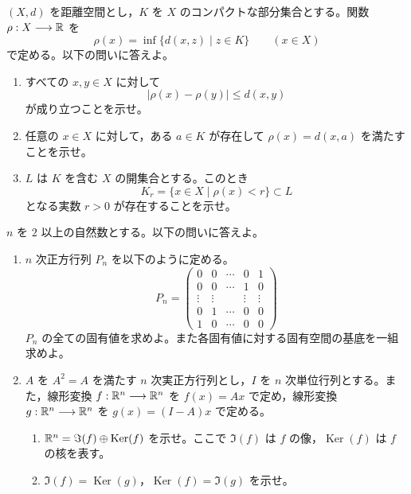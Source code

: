 $(X,d)$ を距離空間とし，$K$ を $X$ のコンパクトな部分集合とする。関数 $\rho:X\longrightarrow\mathbb{R}$ を
\[
\rho(x)=\inf\{d(x,z)\mid z\in K\}\qquad(x\in X)
\]
で定める。以下の問いに答えよ。
\begin{enumerate}
  \item[(問1)] すべての $x,y\in X$ に対して
  \[
  |\rho(x)-\rho(y)|\le d(x,y)
  \]
  が成り立つことを示せ。
  \item[(問2)] 任意の $x\in X$ に対して，ある $a\in K$ が存在して $\rho(x)=d(x,a)$ を満たすことを示せ。
  \item[(問3)] $L$ は $K$ を含む $X$ の開集合とする。このとき
  \[
  K_r=\{x\in X\mid\rho(x)<r\}\subset L
  \]
  となる実数 $r>0$ が存在することを示せ。
\end{enumerate}
\wbend


$n$ を $2$ 以上の自然数とする。以下の問いに答えよ。
\begin{enumerate}
  \item[(問1)] $n$ 次正方行列 $P_n$ を以下のように定める。
  \[
  P_n=\begin{pmatrix}
  0&0&\cdots&0&1\\
  0&0&\cdots&1&0\\
  \vdots&\vdots&&\vdots&\vdots\\
  0&1&\cdots&0&0\\
  1&0&\cdots&0&0
  \end{pmatrix}
  \]
  $P_n$ の全ての固有値を求めよ。また各固有値に対する固有空間の基底を一組求めよ。
  \item[(問2)] $A$ を $A^2=A$ を満たす $n$ 次実正方行列とし，$I$ を $n$ 次単位行列とする。また，線形変換 $f:\mathbb{R}^n\longrightarrow\mathbb{R}^n$ を $f(x)=Ax$ で定め，線形変換 $g:\mathbb{R}^n\longrightarrow\mathbb{R}^n$ を $g(x)=(I-A)x$ で定める。
  \begin{enumerate}
    \item[(i)] $\mathbb{R}^n=\Im(f)\oplus\operatorname{Ker}(f)$ を示せ。ここで $\Im(f)$ は $f$ の像，$\operatorname{Ker}(f)$ は $f$ の核を表す。
    \item[(ii)] $\Im(f)=\operatorname{Ker}(g)$，$\operatorname{Ker}(f)=\Im(g)$ を示せ。
  \end{enumerate}
\end{enumerate}
\wbend

